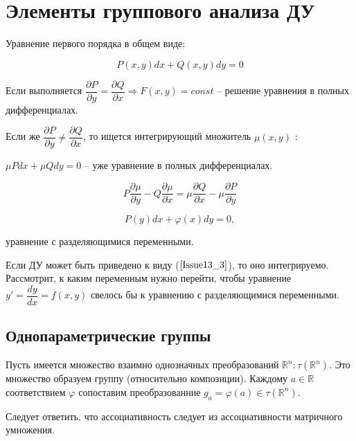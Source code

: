 



\section{Элементы группового анализа ДУ}

Уравнение первого порядка в общем виде:

\begin{equation}
	P(x,y)dx + Q(x,y)dy = 0
	\label{Issue13_1}
\end{equation}

Если выполняется $\dfrac{\partial P}{\partial y} = \dfrac{\partial Q}{\partial x} \Rightarrow F(x,y) = const$ -- решение уравнения в полных дифференциалах.

Если же $\dfrac{\partial P}{\partial y} \neq \dfrac{\partial Q}{\partial x}$, то ищется интегрирующий множитель $\mu(x,y)$ :

$\mu Pdx + \mu Qdy = 0$ -- уже уравнение в полных дифференциалах.

\begin{equation}
	P\frac{\partial \mu}{\partial y} - Q \frac{\partial \mu}{\partial x} = \mu \dfrac{\partial Q}{\partial x} - \mu \dfrac{\partial P}{\partial y}
	\label{Issue13_2}
\end{equation}

\begin{equation}
	P(y)dx + \varphi(x)dy = 0,
	\label{Issue13_3}
\end{equation}

уравнение с разделяющимися переменными.

Если ДУ может быть приведено к виду ($\ref{Issue13_3}$), то оно интегрируемо. Рассмотрит, к каким переменным нужно перейти, чтобы уравнение $y' = \dfrac{dy}{dx} = f(x,y)$ свелось бы к уравнению с разделяющимися переменными.

\subsection{Однопараметрические группы}

Пусть имеется множество взаимно однозначных преобразований $\mathbb{R}^n: \tau(\mathbb{R}^n)$.
Это множество образуем группу (относительно композиции). Каждому $a \in \mathbb{R}$ соответствием $\varphi$ сопоставим преобразованние $g_a = \varphi(a) \in \tau(\mathbb{R}^n)$.

Следует ответить, что ассоциативность следует из ассоциативности матричного умножения.

